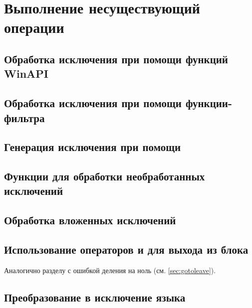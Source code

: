 
\newpage

\section{Выполнение несуществующий операции}

\subsection{Обработка исключения при помощи функций WinAPI}


\subsection{Обработка исключения при помощи функции-фильтра}


\subsection{Генерация исключения при помощи }


\subsection{Функции для обработки необработанных исключений}


\subsection{Обработка вложенных исключений}


\subsection{Использование операторов  и  для выхода из блока }

Аналогично разделу с ошибкой деления на ноль (см. \ref{sec:gotoleave}).

\subsection{Преобразование в исключение языка }

